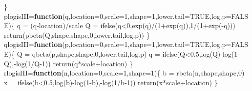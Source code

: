 \documentclass[
]{article}
\newenvironment{Shaded}{\begin{snugshade}}{\end{snugshade}}
\newcommand{\AttributeTok}[1]{\textcolor[rgb]{0.77,0.63,0.00}{#1}}
\newcommand{\ConstantTok}[1]{\textcolor[rgb]{0.00,0.00,0.00}{#1}}
\newcommand{\ControlFlowTok}[1]{\textcolor[rgb]{0.13,0.29,0.53}{\textbf{#1}}}
\newcommand{\DecValTok}[1]{\textcolor[rgb]{0.00,0.00,0.81}{#1}}
\newcommand{\FloatTok}[1]{\textcolor[rgb]{0.00,0.00,0.81}{#1}}
\newcommand{\FunctionTok}[1]{\textcolor[rgb]{0.00,0.00,0.00}{#1}}
\newcommand{\NormalTok}[1]{#1}
\newcommand{\OtherTok}[1]{\textcolor[rgb]{0.56,0.35,0.01}{#1}}
\newcommand{\SpecialCharTok}[1]{\textcolor[rgb]{0.00,0.00,0.00}{#1}}
\begin{document}
\begin{Shaded}
\begin{Highlighting}[]
\NormalTok{\}}
\NormalTok{plogisIII}\OtherTok{=}\ControlFlowTok{function}\NormalTok{(q,}\AttributeTok{location=}\DecValTok{0}\NormalTok{,}\AttributeTok{scale=}\DecValTok{1}\NormalTok{,}\AttributeTok{shape=}\DecValTok{1}\NormalTok{,}\AttributeTok{lower.tail=}\ConstantTok{TRUE}\NormalTok{,}\AttributeTok{log.p=}\ConstantTok{FALSE}\NormalTok{)\{}
\NormalTok{  q }\OtherTok{=}\NormalTok{ (q}\SpecialCharTok{{-}}\NormalTok{location)}\SpecialCharTok{/}\NormalTok{scale}
\NormalTok{  Q }\OtherTok{=} \FunctionTok{ifelse}\NormalTok{(q}\SpecialCharTok{\textless{}}\DecValTok{0}\NormalTok{,}\FunctionTok{exp}\NormalTok{(q)}\SpecialCharTok{/}\NormalTok{(}\DecValTok{1}\SpecialCharTok{+}\FunctionTok{exp}\NormalTok{(q)),}\DecValTok{1}\SpecialCharTok{/}\NormalTok{(}\DecValTok{1}\SpecialCharTok{+}\FunctionTok{exp}\NormalTok{(}\SpecialCharTok{{-}}\NormalTok{q)))}
  \FunctionTok{return}\NormalTok{(}\FunctionTok{pbeta}\NormalTok{(Q,shape,shape,}\DecValTok{0}\NormalTok{,lower.tail,log.p))}
\NormalTok{\}}
\NormalTok{qlogisIII}\OtherTok{=}\ControlFlowTok{function}\NormalTok{(p,}\AttributeTok{location=}\DecValTok{0}\NormalTok{,}\AttributeTok{scale=}\DecValTok{1}\NormalTok{,}\AttributeTok{shape=}\DecValTok{1}\NormalTok{,}\AttributeTok{lower.tail=}\ConstantTok{TRUE}\NormalTok{,}\AttributeTok{log.p=}\ConstantTok{FALSE}\NormalTok{)\{}
\NormalTok{  Q }\OtherTok{=} \FunctionTok{qbeta}\NormalTok{(p,shape,shape,}\DecValTok{0}\NormalTok{,lower.tail,log.p)}
\NormalTok{  q }\OtherTok{=} \FunctionTok{ifelse}\NormalTok{(Q}\SpecialCharTok{\textless{}}\FloatTok{0.5}\NormalTok{,}\FunctionTok{log}\NormalTok{(Q)}\SpecialCharTok{{-}}\FunctionTok{log}\NormalTok{(}\DecValTok{1}\SpecialCharTok{{-}}\NormalTok{Q),}\SpecialCharTok{{-}}\FunctionTok{log}\NormalTok{(}\DecValTok{1}\SpecialCharTok{/}\NormalTok{Q}\DecValTok{{-}1}\NormalTok{))}
  \FunctionTok{return}\NormalTok{(q}\SpecialCharTok{*}\NormalTok{scale}\SpecialCharTok{+}\NormalTok{location)}
\NormalTok{\}}
\NormalTok{rlogisIII}\OtherTok{=}\ControlFlowTok{function}\NormalTok{(n,}\AttributeTok{location=}\DecValTok{0}\NormalTok{,}\AttributeTok{scale=}\DecValTok{1}\NormalTok{,}\AttributeTok{shape=}\DecValTok{1}\NormalTok{)\{}
\NormalTok{  b }\OtherTok{=} \FunctionTok{rbeta}\NormalTok{(n,shape,shape,}\DecValTok{0}\NormalTok{)}
\NormalTok{  x }\OtherTok{=} \FunctionTok{ifelse}\NormalTok{(b}\SpecialCharTok{\textless{}}\FloatTok{0.5}\NormalTok{,}\FunctionTok{log}\NormalTok{(b)}\SpecialCharTok{{-}}\FunctionTok{log}\NormalTok{(}\DecValTok{1}\SpecialCharTok{{-}}\NormalTok{b),}\SpecialCharTok{{-}}\FunctionTok{log}\NormalTok{(}\DecValTok{1}\SpecialCharTok{/}\NormalTok{b}\DecValTok{{-}1}\NormalTok{))}
  \FunctionTok{return}\NormalTok{(x}\SpecialCharTok{*}\NormalTok{scale}\SpecialCharTok{+}\NormalTok{location)}
\NormalTok{\}}
\end{Highlighting}
\end{Shaded}
\end{document}
